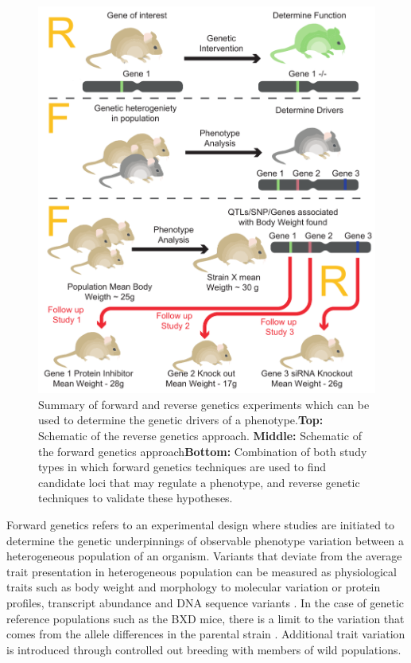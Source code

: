 \documentclass[a4paper,11pt,twoside]{book}
\begin{document}
    \begin{figure}[!htb]
	\centering
	\includegraphics[width=\linewidth]{1.Introduction_Figures/Forward_Genetics.pdf}
	\caption{Summary of forward and reverse genetics experiments which can be used to determine the genetic drivers of a phenotype.\textbf{Top:} Schematic of the reverse genetics approach. \textbf{Middle:} Schematic of the forward genetics approach\textbf{Bottom:} Combination of both study types in which forward genetics techniques are used to find candidate loci that may regulate a phenotype, and reverse genetic techniques to validate these hypotheses.}
	\label{fig:Forward and Reverse Genetics}
	\end{figure}
	
    Forward genetics refers to an experimental design where studies are initiated to determine the genetic underpinnings of observable phenotype variation between a heterogeneous population of an organism. Variants that deviate from the average trait presentation in heterogeneous population can be measured as physiological traits such as body weight and morphology to molecular variation or protein profiles, transcript abundance and DNA sequence variants \citep{MelindaB.TierneyandKurtH.Lamour2005}. In the case of genetic reference populations such as the BXD mice, there is a limit to the variation that comes from the allele differences in the parental strain \citep{Williams2017ResourcesGenetics}. Additional trait variation is introduced through controlled out breeding with members of wild populations\citep{MelindaB.TierneyandKurtH.Lamour2005}.
	
\end{document}
